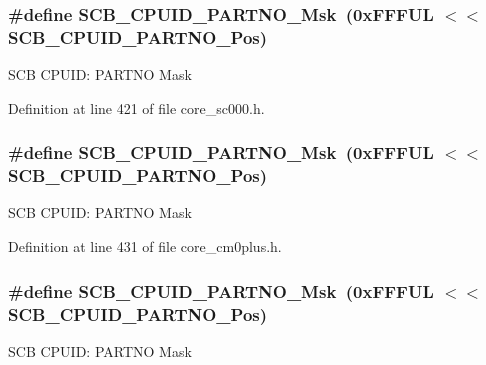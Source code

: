 \subsubsection[{\texorpdfstring{S\+C\+B\+\_\+\+C\+P\+U\+I\+D\+\_\+\+P\+A\+R\+T\+N\+O\+\_\+\+Msk}{SCB_CPUID_PARTNO_Msk}}]{\setlength{\rightskip}{0pt plus 5cm}\#define S\+C\+B\+\_\+\+C\+P\+U\+I\+D\+\_\+\+P\+A\+R\+T\+N\+O\+\_\+\+Msk~(0x\+F\+F\+F\+U\+L $<$$<$ S\+C\+B\+\_\+\+C\+P\+U\+I\+D\+\_\+\+P\+A\+R\+T\+N\+O\+\_\+\+Pos)}\hypertarget{group___c_m_s_i_s___s_c_b_ga98e581423ca016680c238c469aba546d}{}\label{group___c_m_s_i_s___s_c_b_ga98e581423ca016680c238c469aba546d}
S\+CB C\+P\+U\+ID\+: P\+A\+R\+T\+NO Mask 

Definition at line 421 of file core\+\_\+sc000.\+h.

\subsubsection[{\texorpdfstring{S\+C\+B\+\_\+\+C\+P\+U\+I\+D\+\_\+\+P\+A\+R\+T\+N\+O\+\_\+\+Msk}{SCB_CPUID_PARTNO_Msk}}]{\setlength{\rightskip}{0pt plus 5cm}\#define S\+C\+B\+\_\+\+C\+P\+U\+I\+D\+\_\+\+P\+A\+R\+T\+N\+O\+\_\+\+Msk~(0x\+F\+F\+F\+U\+L $<$$<$ S\+C\+B\+\_\+\+C\+P\+U\+I\+D\+\_\+\+P\+A\+R\+T\+N\+O\+\_\+\+Pos)}\hypertarget{group___c_m_s_i_s___s_c_b_ga98e581423ca016680c238c469aba546d}{}\label{group___c_m_s_i_s___s_c_b_ga98e581423ca016680c238c469aba546d}
S\+CB C\+P\+U\+ID\+: P\+A\+R\+T\+NO Mask 

Definition at line 431 of file core\+\_\+cm0plus.\+h.

\subsubsection[{\texorpdfstring{S\+C\+B\+\_\+\+C\+P\+U\+I\+D\+\_\+\+P\+A\+R\+T\+N\+O\+\_\+\+Msk}{SCB_CPUID_PARTNO_Msk}}]{\setlength{\rightskip}{0pt plus 5cm}\#define S\+C\+B\+\_\+\+C\+P\+U\+I\+D\+\_\+\+P\+A\+R\+T\+N\+O\+\_\+\+Msk~(0x\+F\+F\+F\+U\+L $<$$<$ S\+C\+B\+\_\+\+C\+P\+U\+I\+D\+\_\+\+P\+A\+R\+T\+N\+O\+\_\+\+Pos)}\hypertarget{group___c_m_s_i_s___s_c_b_ga98e581423ca016680c238c469aba546d}{}\label{group___c_m_s_i_s___s_c_b_ga98e581423ca016680c238c469aba546d}
S\+CB C\+P\+U\+ID\+: P\+A\+R\+T\+NO Mask 

